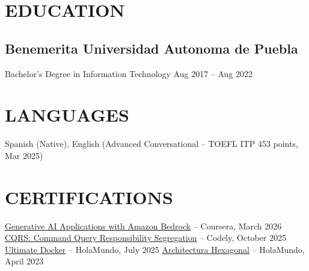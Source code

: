 \documentclass[a4paper,10pt]{article}
\begin{document}
\section*{EDUCATION}

\subsection*{\small Benemerita Universidad Autonoma de Puebla}
Bachelor's Degree in Information Technology \hfill Aug 2017 -- Aug 2022

\section*{LANGUAGES}
Spanish (Native), English (Advanced Conversational -- TOEFL ITP 453 points, Mar 2025)

\section*{CERTIFICATIONS}
    \href{https://coursera.org/verify/HEG7YFDO6D1C}{Generative AI Applications with Amazon Bedrock} -- Coursera, March 2026
    \href{https://www.linkedin.com/in/jose-carlos-huerta-garcia-773952212/details/certifications}{CQRS: Command Query Responsibility Segregation} -- Codely, October 2025
    \href{https://academia.holamundo.io/certificates/fifvbfywmp}{Ultimate Docker} -- HolaMundo, July 2025
    \href{https://www.linkedin.com/in/jose-carlos-huerta-garcia-773952212/details/certifications/1758852008410/single-media-viewer/?profileId=ACoAADXjsscBqtjtdk4S_qpdkHwZs, Fn9y9TiG0o}{Architectura Hexagonal} -- HolaMundo, April 2023
\end{document}
